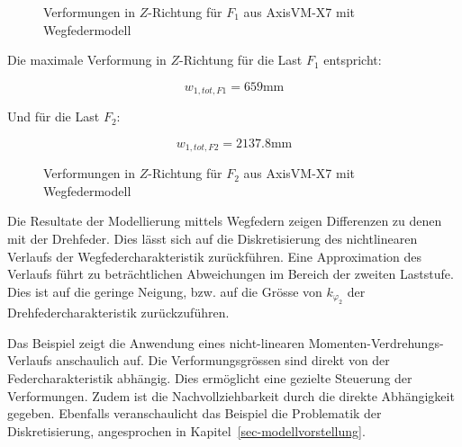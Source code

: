 \documentclass[
  11pt,
  letterpaper,
]{scrreprt}
\begin{document}
\begin{figure}[H]


\caption{\label{fig-f1-wegfeder}Verformungen in \(Z\)-Richtung für
\(F_1\) aus AxisVM-X7 mit Wegfedermodell}

\end{figure}%

Die maximale Verformung in \(Z\)-Richtung für die Last \(F_1\)
entspricht:

\[
w_{1,tot,F1} = 659 \text{mm}
\]

Und für die Last \(F_2\):

\[
w_{1,tot,F2} = 2137.8 \text{mm}
\]

\begin{figure}[H]


\caption{\label{fig-f2-wegfeder}Verformungen in \(Z\)-Richtung für
\(F_2\) aus AxisVM-X7 mit Wegfedermodell}

\end{figure}%

Die Resultate der Modellierung mittels Wegfedern zeigen Differenzen zu
denen mit der Drehfeder. Dies lässt sich auf die Diskretisierung des
nichtlinearen Verlaufs der Wegfedercharakteristik zurückführen. Eine
Approximation des Verlaufs führt zu beträchtlichen Abweichungen im
Bereich der zweiten Laststufe. Dies ist auf die geringe Neigung, bzw.
auf die Grösse von \(k_{\varphi_2}\) der Drehfedercharakteristik
zurückzuführen.

Das Beispiel zeigt die Anwendung eines nicht-linearen
Momenten-Verdrehungs-Verlaufs anschaulich auf. Die Verformungsgrössen
sind direkt von der Federcharakteristik abhängig. Dies ermöglicht eine
gezielte Steuerung der Verformungen. Zudem ist die Nachvollziehbarkeit
durch die direkte Abhängigkeit gegeben. Ebenfalls veranschaulicht das
Beispiel die Problematik der Diskretisierung, angesprochen in
Kapitel~\ref{sec-modellvorstellung}.
\end{document}
